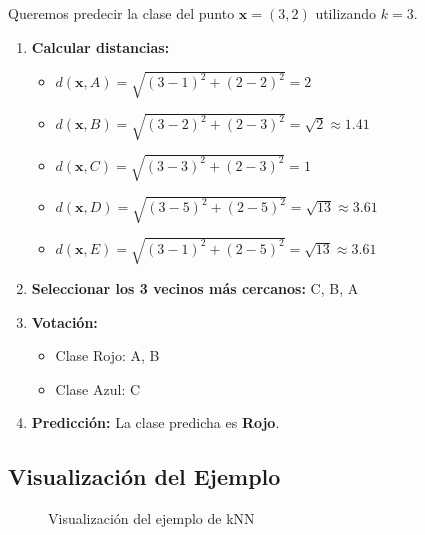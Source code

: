 \documentclass[a4paper, 11pt]{article}
\begin{document}
Queremos predecir la clase del punto $\mathbf{x} = (3,2)$ utilizando $k=3$.

\begin{enumerate}
    \item \textbf{Calcular distancias:}
    \begin{itemize}
        \item $d(\mathbf{x}, A) = \sqrt{(3-1)^2 + (2-2)^2} = 2$
        \item $d(\mathbf{x}, B) = \sqrt{(3-2)^2 + (2-3)^2} = \sqrt{2} \approx 1.41$
        \item $d(\mathbf{x}, C) = \sqrt{(3-3)^2 + (2-3)^2} = 1$
        \item $d(\mathbf{x}, D) = \sqrt{(3-5)^2 + (2-5)^2} = \sqrt{13} \approx 3.61$
        \item $d(\mathbf{x}, E) = \sqrt{(3-1)^2 + (2-5)^2} = \sqrt{13} \approx 3.61$
    \end{itemize}
    \item \textbf{Seleccionar los 3 vecinos más cercanos:} C, B, A
    \item \textbf{Votación:}
    \begin{itemize}
        \item Clase Rojo: A, B
        \item Clase Azul: C
    \end{itemize}
    \item \textbf{Predicción:} La clase predicha es \textbf{Rojo}.
\end{enumerate}

\subsection{Visualización del Ejemplo}
\begin{figure}[h!]
    \centering
    \caption{Visualización del ejemplo de kNN}
\end{figure}
\end{document}
